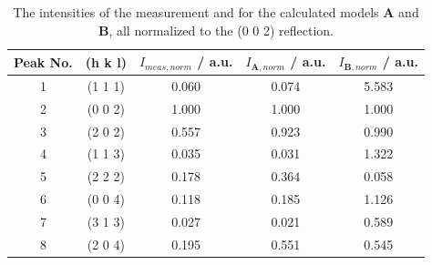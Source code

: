 \begin{table}
    \centering
    \begin{tabular}{c|c c c c}
        \toprule
         Peak No. &   (h k l) &  $I_{meas,norm}$ / a.u. &  $I_{\mathbf{A},norm}$ / a.u. &   $I_{\mathbf{B},norm}$ / a.u. \\
        \midrule
               1 & (1 1 1) &        0.060 &     0.074 &     5.583 \\
               2 & (0 0 2) &        1.000 &     1.000 &     1.000 \\
               3 & (2 0 2) &        0.557 &     0.923 &     0.990 \\
               4 & (1 1 3) &        0.035 &     0.031 &     1.322 \\
               5 & (2 2 2) &        0.178 &     0.364 &     0.058 \\
               6 & (0 0 4) &        0.118 &     0.185 &     1.126 \\
               7 & (3 1 3) &        0.027 &     0.021 &     0.589 \\
               8 & (2 0 4) &        0.195 &     0.551 &     0.545 \\
        \bottomrule
        \end{tabular}
        \caption{The intensities of the measurement and for the calculated models \textbf{A} and \textbf{B}, all normalized to the (0 0 2) reflection.}
        \label{tab:ints}
\end{table}

